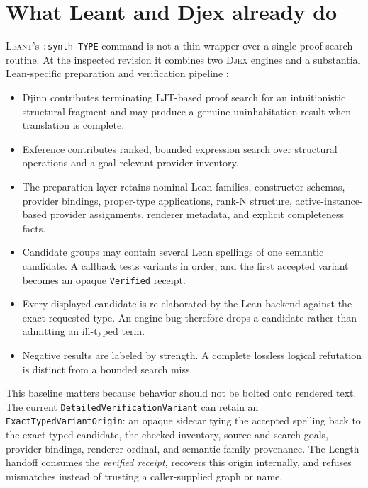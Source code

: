 \documentclass[11pt,oneside]{report}
\newcommand{\Leant}{\textsc{Leant}\xspace}
\newcommand{\Djex}{\textsc{Djex}\xspace}
\newcommand{\code}[1]{\texttt{#1}}
\begin{document}
\section{What Leant and Djex already do}

\Leant's \code{:synth TYPE} command is not a thin wrapper over a single proof search routine. At the inspected revision it combines two \Djex engines and a substantial Lean-specific preparation and verification pipeline \cite{leant-readme,leant-internals,djex-foundation}:

\begin{itemize}[leftmargin=2em]
\item Djinn contributes terminating LJT-based proof search for an intuitionistic structural fragment and may produce a genuine uninhabitation result when translation is complete.
\item Exference contributes ranked, bounded expression search over structural operations and a goal-relevant provider inventory.
\item The preparation layer retains nominal Lean families, constructor schemas, provider bindings, proper-type applications, rank-N structure, active-instance-based provider assignments, renderer metadata, and explicit completeness facts.
\item Candidate groups may contain several Lean spellings of one semantic candidate. A callback tests variants in order, and the first accepted variant becomes an opaque \code{Verified} receipt.
\item Every displayed candidate is re-elaborated by the Lean backend against the exact requested type. An engine bug therefore drops a candidate rather than admitting an ill-typed term.
\item Negative results are labeled by strength. A complete lossless logical refutation is distinct from a bounded search miss.
\end{itemize}

This baseline matters because behavior should not be bolted onto rendered text. The current \code{Detailed\allowbreak Verification\allowbreak Variant} can retain an \code{ExactTypedVariantOrigin}: an opaque sidecar tying the accepted spelling back to the exact typed candidate, the checked inventory, source and search goals, provider bindings, renderer ordinal, and semantic-family provenance. The Length handoff consumes the \emph{verified receipt}, recovers this origin internally, and refuses mismatches instead of trusting a caller-supplied graph or name.
\end{document}
